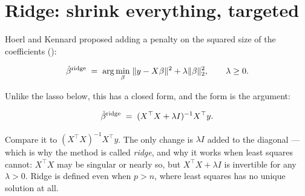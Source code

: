\documentclass[
  letterpaper,
  10pt,
  twoside,
  openright,
  numbers=noenddot,
  chapterprefix=true]{scrbook}
\begin{document}
\section{Ridge: shrink everything,
targeted}\label{ridge-shrink-everything-targeted}

Hoerl and Kennard proposed adding a penalty on the squared size of the
coefficients ():

\[
\hat\beta^{\text{ridge}}
\thickspace=\thickspace
\arg\min_\beta \thickspace \lVert y - X\beta \rVert^2 + \lambda \lVert \beta \rVert_2^2,
\qquad \lambda \ge 0 .
\]

Unlike the lasso below, this has a closed form, and the form is the
argument:

\[
\hat\beta^{\text{ridge}} \thickspace=\thickspace (X^\top X + \lambda I)^{-1} X^\top y .
\]

Compare it to \((X^\top X)^{-1}X^\top y\). The only change is
\(\lambda I\) added to the diagonal --- which is why the method is
called \emph{ridge}, and why it works when least squares cannot:
\(X^\top X\) may be singular or nearly so, but \(X^\top X + \lambda I\)
is invertible for any \(\lambda > 0\). Ridge is defined even when
\(p > n\), where least squares has no unique solution at all.
\end{document}
